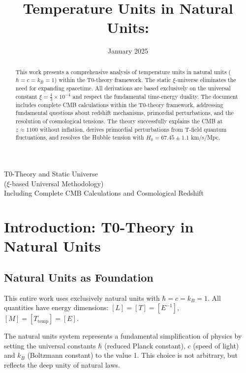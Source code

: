 \documentclass[12pt,a4paper]{report}
\author{}
\date{January 2025}
\begin{document}
\hfuzz=200pt
\allowdisplaybreaks

\title{Temperature Units in Natural Units: \\}
\maketitle
		T0-Theory and Static Universe \\
		($\xi$-based Universal Methodology)\\
		 Including Complete CMB Calculations and Cosmological Redshift

	\begin{abstract}
		This work presents a comprehensive analysis of temperature units in natural units ($\hbar = c = k_B = 1$) within the T0-theory framework. The static $\xi$-universe eliminates the need for expanding spacetime. All derivations are based exclusively on the universal constant $\xi = \frac{4}{3} \times 10^{-4}$ and respect the fundamental time-energy duality. The document includes complete CMB calculations within the T0-theory framework, addressing fundamental questions about redshift mechanisms, primordial perturbations, and the resolution of cosmological tensions. The theory successfully explains the CMB at $z \approx 1100$ without inflation, derives primordial perturbations from T-field quantum fluctuations, and resolves the Hubble tension with $H_0 = 67.45 \pm 1.1$ km/s/Mpc.
	\end{abstract}
	
	\tableofcontents

	\section{Introduction: T0-Theory in Natural Units}
	
	\subsection{Natural Units as Foundation}
	
	\begin{important}
		This entire work uses exclusively natural units with $\hbar = c = k_B = 1$. All quantities have energy dimensions: $[L] = [T] = [E^{-1}]$, $[M] = [T_{\text{temp}}] = [E]$.
	\end{important}
	
	The natural units system represents a fundamental simplification of physics by setting the universal constants $\hbar$ (reduced Planck constant), $c$ (speed of light) and $k_B$ (Boltzmann constant) to the value 1. This choice is not arbitrary, but reflects the deep unity of natural laws.
	
\end{document}
